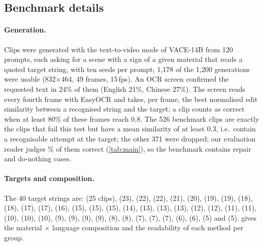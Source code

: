 \subsection{Benchmark details}
\label{sec:supp_bench}

\paragraph{Generation.} Clips were generated with the text-to-video mode of VACE-14B from 120 prompts, each asking for a scene with a sign of a given material that reads a quoted target string, with ten seeds per prompt; 1{,}178 of the 1{,}200 generations were usable (832$\times$464, 49 frames, 15\,fps). An OCR screen confirmed the requested text in 24\% of them (English 21\%, Chinese 27\%). The screen reads every fourth frame with EasyOCR and takes, per frame, the best normalised edit similarity between a recognised string and the target; a clip counts as correct when at least 80\% of these frames reach 0.8. The 526 benchmark clips are exactly the clips that fail this test but have a mean similarity of at least 0.3, i.e.\ contain a recognisable attempt at the target; the other 371 were dropped; our evaluation reader judges \rOrigRead\% of them correct (\cref{tab:main}), so the benchmark contains repair and do-nothing cases.

\paragraph{Targets and composition.} The 40 target strings are:  (25 clips),  (23),  (22),  (22),  (21),  (20),  (19),  (19),  (18),  (18),  (17),  (17),  (16),  (15),  (15),  (15),  (14),  (13),  (13),  (13),  (12),  (12),  (11),  (11),  (10),  (10),  (10),  (9),  (9),  (9),  (9),  (8),  (8),  (7),  (7),  (7),  (6),  (6),  (5) and  (5).  gives the material $\times$ language composition and the readability of each method per group.



